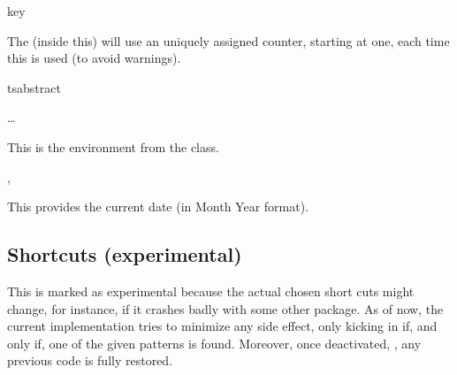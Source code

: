 \documentclass{article}
\begin{document}
\begin{describelist*}{key}
\end{describelist*}
\begin{tsremark}
  The  (inside this) will use an uniquely assigned counter, starting at one, each time this is used (to avoid  warnings).
\end{tsremark}


\begin{codedescribe}[env]{tsabstract}
\begin{codesyntax}
\tsmacro{\begin{tsabstract}}{}
\ldots
\tsmacro{\end{tsabstract}}{}
\end{codesyntax}
This is the  environment from the  class.
\end{codedescribe}

\begin{codedescribe}[code,new=2023/05/16]{\typesetdate,\tsdate}
\begin{codesyntax}
\tsmacro{\typesetdate}{}
\tsmacro{\tsdate}{}
\end{codesyntax}
This provides the current date (in Month Year format).
\end{codedescribe}



\subsection{Shortcuts (experimental)}\label{activ-tokens}
This is marked as experimental because the actual chosen short cuts might change, for instance, if it crashes badly with some other package. As of now, the current implementation tries to minimize any side effect, only kicking in if, and only if, one of the given patterns is found. Moreover, once deactivated, \tsobj{\tsOff}, any previous code is fully restored. 
\end{document}

